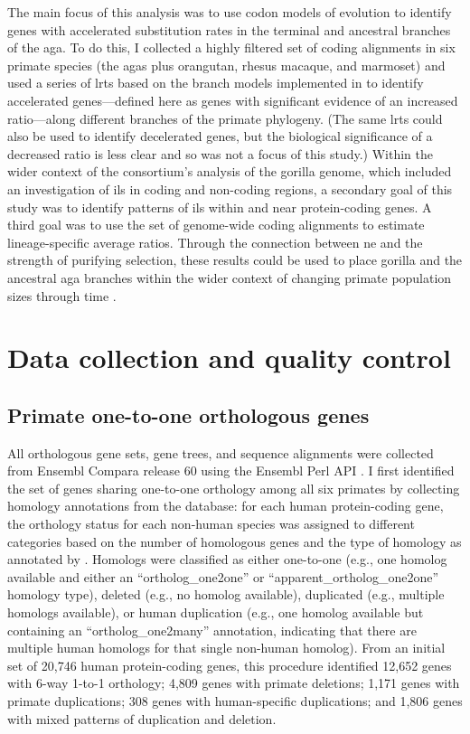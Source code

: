 The main focus of this analysis was to use codon models of evolution
to identify genes with accelerated \nsyn substitution rates in the
terminal and ancestral branches of the \ac{aga}. To do this, I
collected a highly filtered set of coding alignments in six primate
species (the \acp{aga} plus orangutan, rhesus macaque, and marmoset)
and used a series of \acp{lrt} based on the branch models implemented
in  to identify accelerated genes---defined here as genes
with significant evidence of an increased \dnds ratio---along
different branches of the primate phylogeny. (The same \acp{lrt} could
also be used to identify decelerated genes, but the biological
significance of a decreased \dnds ratio is less clear and so was not a
focus of this study.) Within the wider context of the consortium's
analysis of the gorilla genome, which included an investigation of
\ac{ils} in coding and non-coding regions, a secondary goal of this
study was to identify patterns of \ac{ils} within and near
protein-coding genes. A third goal was to use the set of genome-wide
coding alignments to estimate lineage-specific average \dnds
ratios. Through the connection between \ac{ne} and the strength of
purifying selection, these results could be used to place gorilla and
the ancestral \ac{aga} branches within the wider context of changing
primate population sizes through time \citep{Sequencing2005a}.

\section{Data collection and quality control}
\subsection{Primate one-to-one orthologous genes}

All orthologous gene sets, gene trees, and sequence alignments were
collected from Ensembl Compara release 60 using the Ensembl Perl API
\citep{Vilella2009,Flicek2011}. I first identified the set of genes
sharing one-to-one orthology among all six primates by collecting
homology annotations from the \ens \cmp database: for each human
protein-coding gene, the orthology status for each non-human species
was assigned to different categories based on the number of homologous
genes and the type of homology as annotated by \ens. Homologs were
classified as either one-to-one (e.g., one homolog available and
either an ``ortholog\_one2one'' or ``apparent\_ortholog\_one2one''
homology type), deleted (e.g., no homolog available), duplicated
(e.g., multiple homologs available), or human duplication (e.g., one
homolog available but containing an ``ortholog\_one2many'' annotation,
indicating that there are multiple human homologs for that single
non-human homolog). From an initial set of 20,746 human protein-coding
genes, this procedure identified 12,652 genes with 6-way 1-to-1
orthology; 4,809 genes with primate deletions; 1,171 genes with
primate duplications; 308 genes with human-specific duplications; and
1,806 genes with mixed patterns of duplication and deletion.

